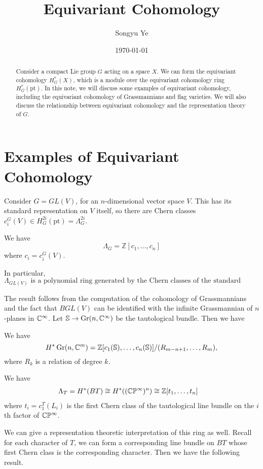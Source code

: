 \documentclass[12pt]{article}
\begin{document}
\rhead{\today}
\cfoot{\thepage}

\title{Equivariant Cohomology}

\author{Songyu Ye}
\date{\today}
\maketitle


\begin{abstract}
    Consider a compact Lie group $G$ acting on a space $X$. We can form the equivariant cohomology $H^*_G(X)$, which is a module over the equivariant cohomology ring $H^*_G(\text{pt})$. In this note, we will discuss some examples of equivariant cohomology, including the equivariant cohomology of Grassmannians and flag varieties. We will also discuss the relationship between equivariant cohomology and the representation theory of $G$.
\end{abstract}

\tableofcontents

\section{Examples of Equivariant Cohomology}
Consider $G = GL(V)$, for an $n$-dimensional vector space $V$. This has its standard representation on $V$ itself, so there are Chern classes $c_i^G(V) \in H_G^{2i}(\text{pt}) = \Lambda_G^{2i}$.

\begin{proposition}
    We have
    \[\Lambda_G = \mathbb{Z}[c_1, \ldots, c_n]\]
    where $c_i = c_i^G(V)$.
\end{proposition}

In particular,
\[\Lambda_{GL(V)} \text{ is a polynomial ring generated by the Chern classes of the standard representation.}\]

The result follows from the computation of the cohomology of Grassmannians and the fact that $BGL(V)$ can be identified with the infinite Grassmannian of $n$-planes in $\mathbb{C}^\infty$. Let $\mathbb{S} \to \operatorname{Gr}(n, \mathbb{C}^\infty)$ be the tautological bundle. Then we have
\begin{lemma}
    We have
    \[H^*\operatorname{Gr}(n, \mathbb{C}^m) = \mathbb{Z}[c_1(\mathbb{S}), \ldots, c_n(\mathbb{S})]/
        (R_{m-n+1}, \ldots, R_m),\]
    where $R_k$ is a relation of degree $k$.
\end{lemma}

\begin{proposition}
    We have\begin{align*}
        \Lambda_T & = H^*(BT) \cong H^*((\mathbb{C}\mathbb{P}^\infty)^n) \cong \mathbb{Z}[t_1, \ldots, t_n]
    \end{align*} where $t_i = c_1^T(L_i)$ is the first Chern class of the tautological line bundle on the $i$th factor of $\mathbb{C}\mathbb{P}^\infty$.
\end{proposition}
We can give a representation theoretic interpretation of this ring as well. Recall for each character of $T$, we can form a corresponding line bundle on $BT$ whose first Chern class is the corresponding character. Then we have the following result.
\end{document}
